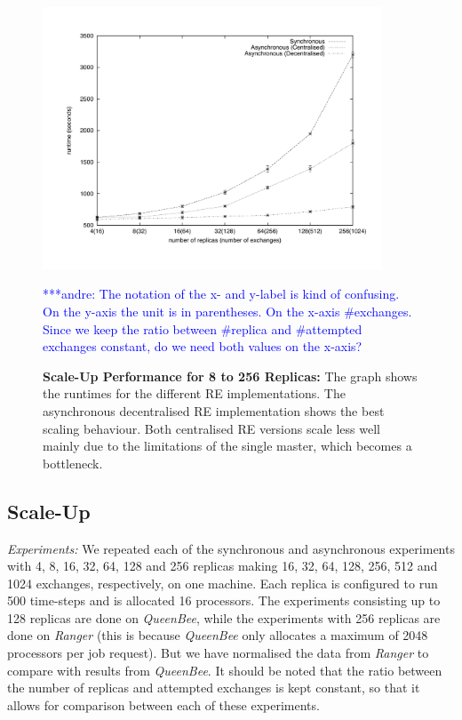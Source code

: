 \documentclass{rspublic}
\newcommand{\alnote}[1]{ {\textcolor{blue} { ***andre: #1 }}}
\newcommand{\alnote}[1]{}
\begin{document}
{%
\begin{figure}
\centering
\includegraphics[width=0.9\textwidth]{../data/scale_up_gnu.pdf}
\caption{\small \textbf{Scale-Up Performance for 8 to 256 Replicas:} 
  The graph shows the runtimes for the different RE implementations.
  The asynchronous decentralised RE implementation shows the best
  scaling behaviour. Both centralised RE versions scale less well mainly due
  to the limitations of the single master, which becomes a bottleneck.}
\label{fig:scaleup}
\alnote{The notation of the x- and y-label is kind of confusing. On the y-axis
the unit is in parentheses. On the x-axis \#exchanges. Since we keep the ratio between
\#replica and \#attempted exchanges constant, do we need both values on the x-axis?}
\vspace{-1em}
\end{figure}

\subsection{Scale-Up}


{\it Experiments: }
We repeated each of the synchronous and asynchronous experiments with 4, 8, 16, 32, 64, 128 and 256 replicas making 16, 32, 64, 128, 256, 512 and 1024 exchanges, respectively, on one machine. Each replica is configured to run 500 time-steps and is allocated 16 processors. The experiments consisting up to 128 replicas are done on {\it QueenBee}, while the experiments with 256 replicas are done on \emph{Ranger} (this is because \emph{QueenBee} only allocates a maximum of 2048 processors per job request). But we have normalised the data from {\it Ranger} to compare with results from \emph{QueenBee}.
It should be noted that the ratio between the number of
replicas and attempted exchanges is kept constant, so that it allows for comparison between each of these experiments.

}
\end{document}
